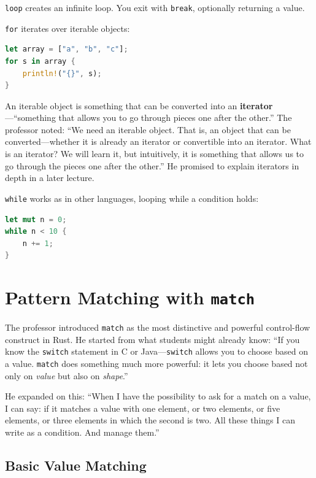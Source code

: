 \texttt{loop} creates an infinite loop. You exit with \texttt{break}, optionally returning a value.

\texttt{for} iterates over iterable objects:

\begin{lstlisting}[language=Rust]
let array = ["a", "b", "c"];
for s in array {
    println!("{}", s);
}
\end{lstlisting}

An iterable object is something that can be converted into an \textbf{iterator}---``something that allows you to go through pieces one after the other.'' The professor noted: ``We need an iterable object. That is, an object that can be converted---whether it is already an iterator or convertible into an iterator. What is an iterator? We will learn it, but intuitively, it is something that allows us to go through the pieces one after the other.'' He promised to explain iterators in depth in a later lecture.

\texttt{while} works as in other languages, looping while a condition holds:

\begin{lstlisting}[language=Rust]
let mut n = 0;
while n < 10 {
    n += 1;
}
\end{lstlisting}

\section{Pattern Matching with \texttt{match}}

The professor introduced \texttt{match} as the most distinctive and powerful control-flow construct in Rust. He started from what students might already know: ``If you know the \texttt{switch} statement in C or Java---\texttt{switch} allows you to choose based on a value. \texttt{match} does something much more powerful: it lets you choose based not only on \emph{value} but also on \emph{shape}.''

He expanded on this: ``When I have the possibility to ask for a match on a value, I can say: if it matches a value with one element, or two elements, or five elements, or three elements in which the second is two. All these things I can write as a condition. And manage them.''

\subsection{Basic Value Matching}

